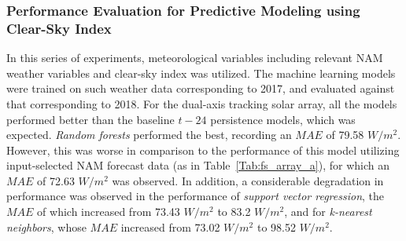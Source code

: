 \subsubsection*{Performance Evaluation for Predictive Modeling using Clear-Sky Index}
\par In this series of experiments, meteorological variables including relevant NAM weather variables and clear-sky index was utilized. The machine learning models were trained on such weather data corresponding to 2017, and evaluated against that corresponding to 2018. For the dual-axis tracking solar array, all the models performed better than the baseline $t-24$ persistence models, which was expected. \textit{Random forests} performed the best, recording an $MAE$ of 79.58 $W/m^2$. However, this was worse in comparison to the performance of this model utilizing input-selected NAM forecast data (as in Table~\ref{Tab:fs_array_a}), for which an $MAE$ of 72.63 $W/m^2$ was observed. In addition, a considerable degradation in performance was observed in the performance of \textit{support vector regression}, the $MAE$ of which increased from 73.43 $W/m^2$ to 83.2 $W/m^2$, and for \textit{k-nearest neighbors}, whose $MAE$ increased from 73.02 $W/m^2$ to 98.52 $W/m^2$.

